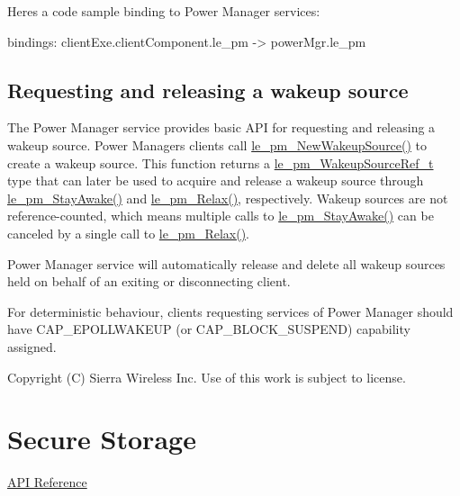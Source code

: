 Here\textquotesingle{}s a code sample binding to Power Manager services\+: \begin{DoxyVerb}bindings:
{
   clientExe.clientComponent.le_pm -> powerMgr.le_pm
}
\end{DoxyVerb}
\hypertarget{c_pm_le_pm_request}{}\subsection{Requesting and releasing a wakeup source}\label{c_pm_le_pm_request}
The Power Manager service provides basic A\+P\+I for requesting and releasing a wakeup source. Power Manager\textquotesingle{}s clients call {\ttfamily \hyperlink{le__pm__interface_8h_a85038248bcddc8963f7280ffa53acf62}{le\+\_\+pm\+\_\+\+New\+Wakeup\+Source()}} to create a wakeup source. This function returns a \hyperlink{le__pm__interface_8h_af959045ad2b6c98fa2bbeb456c7bb9f5}{le\+\_\+pm\+\_\+\+Wakeup\+Source\+Ref\+\_\+t} type that can later be used to acquire and release a wakeup source through {\ttfamily \hyperlink{le__pm__interface_8h_a6be9b6c443c506b0ce29da79e53e2534}{le\+\_\+pm\+\_\+\+Stay\+Awake()}} and \hyperlink{le__pm__interface_8h_a2ffb1fb0d165604226a9df35360080ea}{le\+\_\+pm\+\_\+\+Relax()}, respectively. Wakeup sources are not reference-\/counted, which means multiple calls to \hyperlink{le__pm__interface_8h_a6be9b6c443c506b0ce29da79e53e2534}{le\+\_\+pm\+\_\+\+Stay\+Awake()} can be canceled by a single call to \hyperlink{le__pm__interface_8h_a2ffb1fb0d165604226a9df35360080ea}{le\+\_\+pm\+\_\+\+Relax()}.

Power Manager service will automatically release and delete all wakeup sources held on behalf of an exiting or disconnecting client.

For deterministic behaviour, clients requesting services of Power Manager should have C\+A\+P\+\_\+\+E\+P\+O\+L\+L\+W\+A\+K\+E\+U\+P (or C\+A\+P\+\_\+\+B\+L\+O\+C\+K\+\_\+\+S\+U\+S\+P\+E\+N\+D) capability assigned.





Copyright (C) Sierra Wireless Inc. Use of this work is subject to license. \hypertarget{c_secStore}{}\section{Secure Storage}\label{c_secStore}
\hyperlink{le__sec_store__interface_8h}{A\+P\+I Reference}





